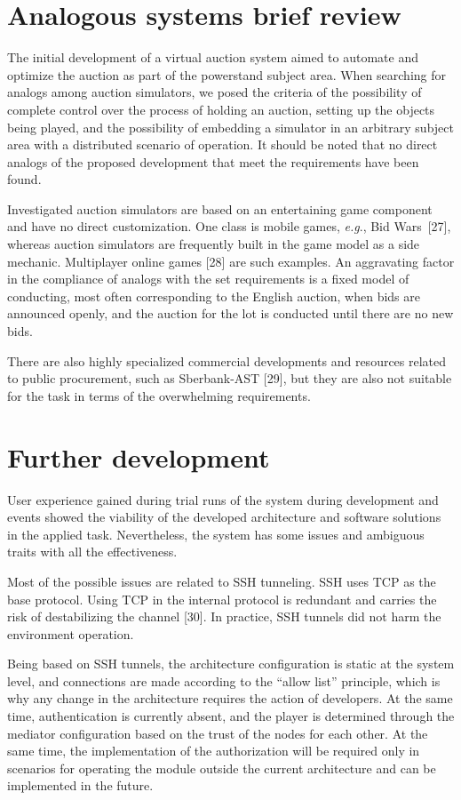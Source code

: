 \documentclass[
]{ceurart}
\begin{document}
\section{Analogous systems brief review}
\label{sec:analogs}

The initial development of a virtual auction system aimed to automate and optimize the auction as part of the powerstand subject area. When searching for analogs among auction simulators, we posed the criteria of the possibility of complete control over the process of holding an auction, setting up the objects being played, and the possibility of embedding a simulator in an arbitrary subject area with a distributed scenario of operation. It should be noted that no direct analogs of the proposed development that meet the requirements have been found.

Investigated auction simulators are based on an entertaining game component and have no direct customization. One class is mobile games, \emph{e.g}., Bid Wars~[27], whereas auction simulators are frequently built in the game model as a side mechanic. Multiplayer online games [28] are such examples. An aggravating factor in the compliance of analogs with the set requirements is a fixed model of conducting, most often corresponding to the English auction, when bids are announced openly, and the auction for the lot is conducted until there are no new bids.

There are also highly specialized commercial developments and resources related to public procurement, such as Sberbank-AST [29], but they are also not suitable for the task in terms of the overwhelming requirements.

\section{Further development}
\label{sec:further}

User experience gained during trial runs of the system during development and events showed the viability of the developed architecture and software solutions in the applied task. Nevertheless, the system has some issues and ambiguous traits with all the effectiveness.

Most of the possible issues are related to SSH tunneling. SSH uses TCP as the base protocol. Using TCP in the internal protocol is redundant and carries the risk of destabilizing the channel [30]. In practice, SSH tunnels did not harm the environment operation.

Being based on SSH tunnels, the architecture configuration is static at the system level, and connections are made according to the “allow list” principle, which is why any change in the architecture requires the action of developers. At the same time, authentication is currently absent, and the player is determined through the mediator configuration based on the trust of the nodes for each other. At the same time, the implementation of the authorization will be required only in scenarios for operating the module outside the current architecture and can be implemented in the future.
\end{document}
